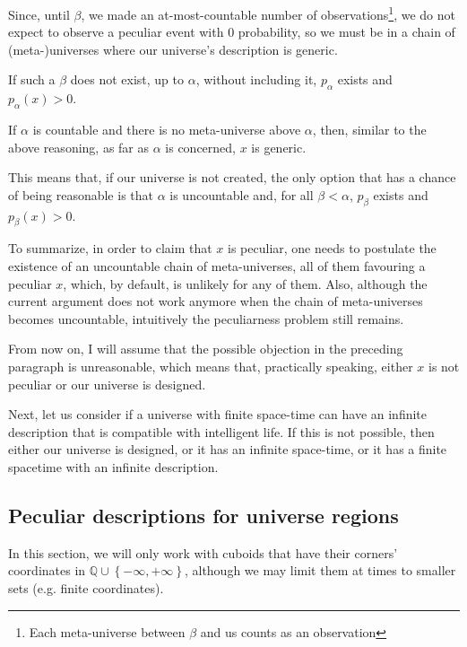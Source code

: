 \documentclass[a4paper
,draft
]{article}
\newcommand{\svn}[2][]{\todo[author=Virgil,color=red!25!white,#1]{#2}}
\def\rationale{\mathbb{Q}}
\newcommand{\multime}[1]{\left\{ #1 \right\}}
\newcommand{\ghilimele}[1]{``#1"}
\begin{document}
Since, until $\beta$, we made an at-most-countable number of
observations\footnote{Each meta-universe between $\beta$ and us counts as an
observation}, we
do not expect to observe a peculiar event with $0$ probability, so we must be
in a chain of (meta-)universes where our universe's description is
generic.
\svn{+quote. Qhat did I mean by \ghilimele{quote}?}

If such a $\beta$ does not exist, up to $\alpha$, without including it,
$p_\alpha$ exists and $p_\alpha(x) > 0$.

If $\alpha$ is countable and there is no meta-universe above $\alpha$,
then, similar to the above reasoning, as far as $\alpha$ is concerned,
$x$ is generic.

This means that, if our universe is not created, the only option that
has a chance of being reasonable is that $\alpha$ is uncountable and,
for all $\beta < \alpha$, $p_\beta$ exists and $p_\beta(x) > 0$.

To summarize, in order to claim that $x$ is peculiar, one needs to postulate the
existence of an uncountable chain of meta-universes, all of them favouring a
peculiar $x$, which, by default, is unlikely for any of them. Also, although the
current argument does not work anymore when the chain of
meta-universes becomes uncountable, intuitively the peculiarness problem
still remains.

From now on, I will assume that the possible objection in the preceding
paragraph is unreasonable, which means that, practically speaking,
either $x$ is not peculiar or our universe is designed.

Next, let us consider if a universe with finite space-time can have an
infinite description that is compatible with intelligent life. If this is not
possible, then either our universe is designed, or it has an infinite
space-time, or it has a finite spacetime with an infinite description.

\subsection{Peculiar descriptions for universe regions}

In this section, we will only work with cuboids that have their
corners' coordinates
in $\rationale\cup\multime{-\infty, +\infty}$, although we may limit
them at times to smaller sets (e.g. finite coordinates).
\end{document}
